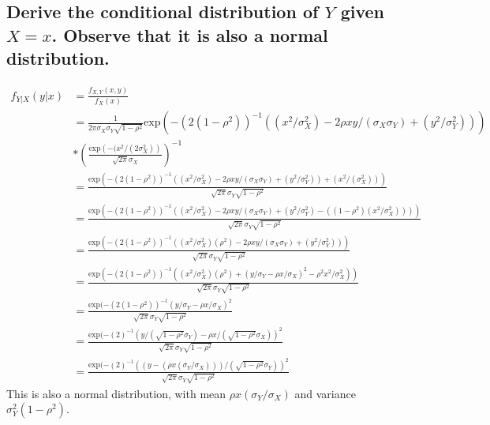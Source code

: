 \documentclass[11pt]{article} %
\begin{document}
\subsection{Derive the conditional distribution of $Y$ given $X=x$. Observe that it is also a normal distribution.}
\begin{align*}
f_{Y|X}(y|x) &= \frac{f_{X,Y}(x,y)}{f_X(x)}\\ &= \frac{1}{2\pi\sigma_X\sigma_Y\sqrt{1-\rho^2}}\text{exp}\left( -(2(1-\rho^2))^{-1}((x^2/\sigma_X^2) - 2\rho xy/(\sigma_X\sigma_Y) + (y^2/\sigma_Y^2))\right) \\ &*\left(\frac{\text{exp}\left(  -(x^2/(2\sigma_X^2)\right)}{\sqrt{2\pi}\sigma_X} \right)^{-1} \\
&=  \frac{\text{exp}(-(2(1-\rho^2))^{-1}((x^2/\sigma_X^2) - 2\rho xy/(\sigma_X\sigma_Y) + (y^2/\sigma_Y^2))+ (x^2/(\sigma_X^2)))}{\sqrt{2\pi}\sigma_Y\sqrt{1-\rho^2}}\\
&= \frac{\text{exp}(-(2(1-\rho^2))^{-1}((x^2/\sigma_X^2) - 2\rho xy/(\sigma_X\sigma_Y) + (y^2/\sigma_Y^2) - ((1-\rho^2)(x^2/\sigma_X^2))))}{\sqrt{2\pi}\sigma_Y\sqrt{1-\rho^2}}\\
&= \frac{\text{exp}(-(2(1-\rho^2))^{-1}((x^2/\sigma_X^2)(\rho^2 ) - 2\rho xy/(\sigma_X\sigma_Y) + (y^2/\sigma_Y^2)))}{\sqrt{2\pi}\sigma_Y\sqrt{1-\rho^2}}\\
&= \frac{\text{exp}(-(2(1-\rho^2))^{-1}((x^2/\sigma_X^2)(\rho^2 ) + (y/\sigma_Y - \rho x/\sigma_X)^2- \rho^2x^2/\sigma_X^2 ))}{\sqrt{2\pi}\sigma_Y\sqrt{1-\rho^2}}\\
&= \frac{\text{exp}(-(2(1-\rho^2))^{-1}(y/\sigma_Y - \rho x/\sigma_X)^2}{\sqrt{2\pi}\sigma_Y\sqrt{1-\rho^2}}\\
&= \frac{\text{exp}(-(2)^{-1}(y/(\sqrt{1-\rho^2}\sigma_Y) - \rho x/(\sqrt{1-\rho^2}\sigma_X))^2}{\sqrt{2\pi}\sigma_Y\sqrt{1-\rho^2}}\\
&= \frac{\text{exp}(-(2)^{-1}((y - (\rho x (\sigma_Y/\sigma_X)))/(\sqrt{1-\rho^2}\sigma_Y))^2}{\sqrt{2\pi}\sigma_Y\sqrt{1-\rho^2}}
\end{align*}
This is also a normal distribution, with mean $\rho x (\sigma_Y/\sigma_X)$ and variance $\sigma_Y^2(1-\rho^2)$.
\end{document}
